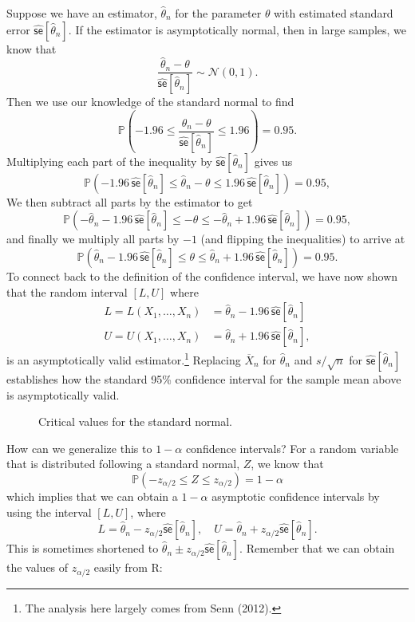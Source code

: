 \documentclass[
  13pt,
  letterpaper,
  DIV=11,
  numbers=noendperiod]{scrreprt}
\newcommand{\N}{\mathcal{N}}
\newcommand{\se}{\textsf{se}}
\renewcommand{\P}{\mathbb{P}}
\newcommand{\Xbar}{\overline{X}}
\theoremstyle{plain}
\theoremstyle{definition}
\theoremstyle{definition}
\theoremstyle{remark}
\begin{document}
Suppose we have an estimator, \(\widehat{\theta}_n\) for the parameter
\(\theta\) with estimated standard error
\(\widehat{\se}[\widehat{\theta}_n]\). If the estimator is
asymptotically normal, then in large samples, we know that \[ 
\frac{\widehat{\theta}_n - \theta}{\widehat{\se}[\widehat{\theta}_n]} \sim \N(0, 1).
\] Then we use our knowledge of the standard normal to find \[ 
\P\left( -1.96 \leq \frac{\widehat{\theta}_n - \theta}{\widehat{\se}[\widehat{\theta}_n]} \leq 1.96\right) = 0.95.
\] Multiplying each part of the inequality by
\(\widehat{\se}[\widehat{\theta}_n]\) gives us \[ 
\P\left( -1.96\,\widehat{\se}[\widehat{\theta}_n] \leq \widehat{\theta}_n - \theta \leq 1.96\,\widehat{\se}[\widehat{\theta}_n]\right) = 0.95,
\] We then subtract all parts by the estimator to get \[ 
\P\left(-\widehat{\theta}_n - 1.96\,\widehat{\se}[\widehat{\theta}_n] \leq - \theta \leq -\widehat{\theta}_n + 1.96\,\widehat{\se}[\widehat{\theta}_n]\right) = 0.95,
\] and finally we multiply all parts by \(-1\) (and flipping the
inequalities) to arrive at \[ 
\P\left(\widehat{\theta}_n - 1.96\,\widehat{\se}[\widehat{\theta}_n] \leq \theta \leq \widehat{\theta}_n + 1.96\,\widehat{\se}[\widehat{\theta}_n]\right) = 0.95.
\] To connect back to the definition of the confidence interval, we have
now shown that the random interval \([L, U]\) where \[ 
\begin{aligned}
  L = L(X_1, \ldots, X_n) &= \widehat{\theta}_n - 1.96\,\widehat{\se}[\widehat{\theta}_n] \\
  U = U(X_1, \ldots, X_n) &= \widehat{\theta}_n + 1.96\,\widehat{\se}[\widehat{\theta}_n],
\end{aligned}
\] is an asymptotically valid estimator.\footnote{The analysis here
  largely comes from Senn (2012).} Replacing \(\Xbar_n\) for
\(\widehat{\theta}_n\) and \(s/\sqrt{n}\) for
\(\widehat{\se}[\widehat{\theta}_n]\) establishes how the standard 95\%
confidence interval for the sample mean above is asymptotically valid.

\begin{figure}[th]


\caption{\label{fig-std-normal}Critical values for the standard normal.}

\end{figure}%

How can we generalize this to \(1-\alpha\) confidence intervals? For a
random variable that is distributed following a standard normal, \(Z\),
we know that \[ 
\P(-z_{\alpha/2} \leq Z \leq z_{\alpha/2}) = 1-\alpha
\] which implies that we can obtain a \(1-\alpha\) asymptotic confidence
intervals by using the interval \([L, U]\), where \[ 
L = \widehat{\theta}_{n} - z_{\alpha/2} \widehat{\se}[\widehat{\theta}_{n}], \quad U = \widehat{\theta}_{n} + z_{\alpha/2} \widehat{\se}[\widehat{\theta}_{n}]. 
\] This is sometimes shortened to
\(\widehat{\theta}_n \pm z_{\alpha/2} \widehat{\se}[\widehat{\theta}_{n}]\).
Remember that we can obtain the values of \(z_{\alpha/2}\) easily from
R:
\end{document}
